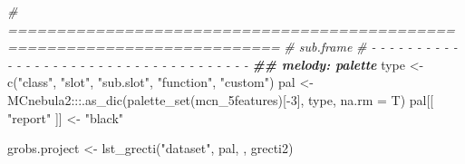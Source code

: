 \documentclass[
]{article}
\newenvironment{Shaded}{\begin{snugshade}}{\end{snugshade}}
\newcommand{\AttributeTok}[1]{\textcolor[rgb]{0.77,0.63,0.00}{#1}}
\newcommand{\CommentTok}[1]{\textcolor[rgb]{0.56,0.35,0.01}{\textit{#1}}}
\newcommand{\DecValTok}[1]{\textcolor[rgb]{0.00,0.00,0.81}{#1}}
\newcommand{\DocumentationTok}[1]{\textcolor[rgb]{0.56,0.35,0.01}{\textbf{\textit{#1}}}}
\newcommand{\FunctionTok}[1]{\textcolor[rgb]{0.00,0.00,0.00}{#1}}
\newcommand{\NormalTok}[1]{#1}
\newcommand{\OtherTok}[1]{\textcolor[rgb]{0.56,0.35,0.01}{#1}}
\newcommand{\SpecialCharTok}[1]{\textcolor[rgb]{0.00,0.00,0.00}{#1}}
\newcommand{\StringTok}[1]{\textcolor[rgb]{0.31,0.60,0.02}{#1}}
\begin{document}
\begin{Shaded}
\begin{Highlighting}[]
\CommentTok{\# ==========================================================================}
\CommentTok{\# sub.frame}
\CommentTok{\# {-} {-} {-} {-} {-} {-} {-} {-} {-} {-} {-} {-} {-} {-} {-} {-} {-} {-} {-} {-} {-} {-} {-} {-} {-} {-} {-} {-} {-} {-} {-} {-} {-} {-} {-} {-} {-}}
\DocumentationTok{\#\# melody: palette}
\NormalTok{type }\OtherTok{\textless{}{-}} \FunctionTok{c}\NormalTok{(}\StringTok{"class"}\NormalTok{, }\StringTok{"slot"}\NormalTok{, }\StringTok{"sub.slot"}\NormalTok{, }\StringTok{"function"}\NormalTok{, }\StringTok{"custom"}\NormalTok{)}
\NormalTok{pal }\OtherTok{\textless{}{-}}\NormalTok{ MCnebula2}\SpecialCharTok{:::}\FunctionTok{.as\_dic}\NormalTok{(}\FunctionTok{palette\_set}\NormalTok{(mcn\_5features)[}\SpecialCharTok{{-}}\DecValTok{3}\NormalTok{], type, }\AttributeTok{na.rm =}\NormalTok{ T)}
\NormalTok{pal[[ }\StringTok{"report"}\NormalTok{ ]] }\OtherTok{\textless{}{-}} \StringTok{"black"}

\NormalTok{grobs.project }\OtherTok{\textless{}{-}} \FunctionTok{lst\_grecti}\NormalTok{(}\StringTok{"dataset"}\NormalTok{, pal, , grecti2)}
\end{Highlighting}
\end{Shaded}
\end{document}
